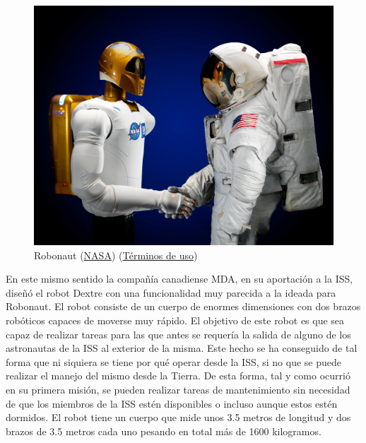 \begin{figure}[!h]
	\centering
	\includegraphics[scale=0.2]{./EtapaModerna/Imagenes/robonaut.jpg}
	\caption{Robonaut (\href{https://www.nasa.gov/images/content/491272main_robonaut2_lg.jpg}{NASA}) (\href{https://pmm.nasa.gov/image-use-policy}{Términos de uso})}
	\label{fig:robonaut}
\end{figure}

En este mismo sentido la compañía canadiense MDA, en su aportación a la ISS, diseñó el robot Dextre con una funcionalidad muy parecida a la ideada para Robonaut. El robot consiste de un cuerpo de enormes dimensiones con dos brazos robóticos capaces de moverse muy rápido. El objetivo de este robot es que sea capaz de realizar tareas para las que antes se requería la salida de alguno de los astronautas de la ISS al exterior de la misma. Este hecho se ha conseguido de tal forma que ni siquiera se tiene por qué operar desde la ISS, si no que se puede realizar el manejo del mismo desde la Tierra. De esta forma, tal y como ocurrió en su primera misión, se pueden realizar tareas de mantenimiento sin necesidad de que los miembros de la ISS estén disponibles o incluso aunque estos estén dormidos. El robot tiene un cuerpo que mide unos 3.5 metros de longitud y dos brazos de 3.5 metros cada uno pesando en total más de 1600 kilogramos.

